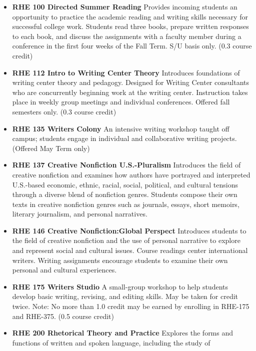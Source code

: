 \documentclass[
  letterpaper,
]{scrbook}
\providecommand{\tightlist}{%
  \setlength{\itemsep}{0pt}\setlength{\parskip}{0pt}}
\begin{document}
\begin{itemize}
\tightlist
\item
  \textbf{RHE 100 Directed Summer Reading} Provides incoming students an
  opportunity to practice the academic reading and writing skills
  necessary for successful college work. Students read three books,
  prepare written responses to each book, and discuss the assignments
  with a faculty member during a conference in the first four weeks of
  the Fall Term. S/U basis only. (0.3 course credit)\\
\item
  \textbf{RHE 112 Intro to Writing Center Theory} Introduces foundations
  of writing center theory and pedagogy. Designed for Writing Center
  consultants who are concurrently beginning work at the writing center.
  Instruction takes place in weekly group meetings and individual
  conferences. Offered fall semesters only. (0.3 course credit)
\item
  \textbf{RHE 135 Writers Colony} An intensive writing workshop taught
  off campus; students engage in individual and collaborative writing
  projects. (Offered May Term only)\\
\item
  \textbf{RHE 137 Creative Nonfiction U.S.-Pluralism} Introduces the
  field of creative nonfiction and examines how authors have portrayed
  and interpreted U.S.-based economic, ethnic, racial, social,
  political, and cultural tensions through a diverse blend of nonfiction
  genres. Students compose their own texts in creative nonfiction genres
  such as journals, essays, short memoirs, literary journalism, and
  personal narratives.
\item
  \textbf{RHE 146 Creative Nonfiction:Global Perspect} Introduces
  students to the field of creative nonfiction and the use of personal
  narrative to explore and represent social and cultural issues. Course
  readings center international writers. Writing assignments encourage
  students to examine their own personal and cultural experiences.\\
\item
  \textbf{RHE 175 Writers Studio} A small-group workshop to help
  students develop basic writing, revising, and editing skills. May be
  taken for credit twice. Note: No more than 1.0 credit may be earned by
  enrolling in RHE-175 and RHE-375. (0.5 course credit)
\item
  \textbf{RHE 200 Rhetorical Theory and Practice} Explores the forms and
  functions of written and spoken language, including the study of

\end{itemize}
\end{document}
